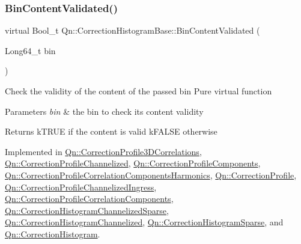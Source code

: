 \mbox{\label{classQn_1_1CorrectionHistogramBase_a4db2c92ceaffefaa91475a721612d80d}} 
\subsubsection{\texorpdfstring{Bin\+Content\+Validated()}{BinContentValidated()}}
{\footnotesize\ttfamily virtual Bool\+\_\+t Qn\+::\+Correction\+Histogram\+Base\+::\+Bin\+Content\+Validated (\begin{DoxyParamCaption}\item[{Long64\+\_\+t}]{bin }\end{DoxyParamCaption})\hspace{0.3cm}{\ttfamily [pure virtual]}}

Check the validity of the content of the passed bin Pure virtual function 
\begin{DoxyParams}{Parameters}
{\em bin} & the bin to check its content validity \\
\hline
\end{DoxyParams}
\begin{DoxyReturn}{Returns}
k\+T\+R\+UE if the content is valid k\+F\+A\+L\+SE otherwise 
\end{DoxyReturn}


Implemented in \mbox{\hyperlink{classQn_1_1CorrectionProfile3DCorrelations_ad771201bd096e4e9bd028891baa032d9}{Qn\+::\+Correction\+Profile3\+D\+Correlations}}, \mbox{\hyperlink{classQn_1_1CorrectionProfileChannelized_a1a7640ed888a3357d28f3f0f8e8b4bec}{Qn\+::\+Correction\+Profile\+Channelized}}, \mbox{\hyperlink{classQn_1_1CorrectionProfileComponents_a0fd41214d81f38e1a468fba4441e762c}{Qn\+::\+Correction\+Profile\+Components}}, \mbox{\hyperlink{classQn_1_1CorrectionProfileCorrelationComponentsHarmonics_aed95bd8eea2e060ba3040d25f3533177}{Qn\+::\+Correction\+Profile\+Correlation\+Components\+Harmonics}}, \mbox{\hyperlink{classQn_1_1CorrectionProfile_a299a9d176bfeeb1966bedad226c7c4b2}{Qn\+::\+Correction\+Profile}}, \mbox{\hyperlink{classQn_1_1CorrectionProfileChannelizedIngress_ad21ca0cea3bb64b832da59a99da2603a}{Qn\+::\+Correction\+Profile\+Channelized\+Ingress}}, \mbox{\hyperlink{classQn_1_1CorrectionProfileCorrelationComponents_a10db27a0f3bc8c52b3b188eb7395f835}{Qn\+::\+Correction\+Profile\+Correlation\+Components}}, \mbox{\hyperlink{classQn_1_1CorrectionHistogramChannelizedSparse_a46f0289fe5ddd088356679486d8376d6}{Qn\+::\+Correction\+Histogram\+Channelized\+Sparse}}, \mbox{\hyperlink{classQn_1_1CorrectionHistogramChannelized_a12342a47b865927f259043f6816cf2e8}{Qn\+::\+Correction\+Histogram\+Channelized}}, \mbox{\hyperlink{classQn_1_1CorrectionHistogramSparse_a0af98e0b06c550ed265494e1f3089779}{Qn\+::\+Correction\+Histogram\+Sparse}}, and \mbox{\hyperlink{classQn_1_1CorrectionHistogram_a26d4a5cb3aebf1c447bba10359224a62}{Qn\+::\+Correction\+Histogram}}.

